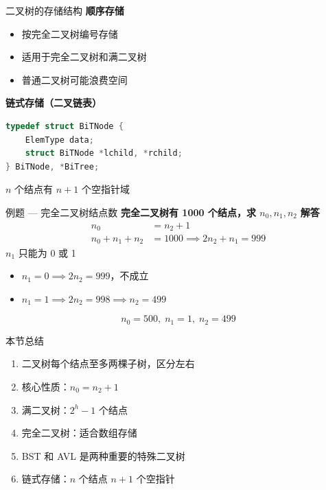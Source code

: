 \documentclass[10pt, aspectratio=169]{beamer}
\begin{document}
\begin{frame}[fragile]{二叉树的存储结构}
    \textbf{顺序存储}
    \begin{itemize}
        \item 按完全二叉树编号存储
        \item 适用于完全二叉树和满二叉树
        \item 普通二叉树可能浪费空间
    \end{itemize}
    \vspace{0.3em}
    \textbf{链式存储（二叉链表）}
    \begin{lstlisting}[language=C, basicstyle=\ttfamily\small]
typedef struct BiTNode {
    ElemType data;
    struct BiTNode *lchild, *rchild;
} BiTNode, *BiTree;
    \end{lstlisting}
    \vspace{0.3em}
    $n$ 个结点有 $n+1$ 个空指针域
\end{frame}

\begin{frame}{例题 --- 完全二叉树结点数}
    \textbf{完全二叉树有 1000 个结点，求 $n_0, n_1, n_2$}
    \vspace{0.5em}
    \textbf{解答}
    \[
    \begin{aligned}
    n_0 &= n_2 + 1\\
    n_0 + n_1 + n_2 &= 1000 \implies 2n_2 + n_1 = 999
    \end{aligned}
    \]
    $n_1$ 只能为 0 或 1
    \begin{itemize}
        \item $n_1 = 0 \implies 2n_2 = 999$，不成立
        \item $n_1 = 1 \implies 2n_2 = 998 \implies n_2 = 499$
    \end{itemize}
    \[
    n_0 = 500,\; n_1 = 1,\; n_2 = 499
    \]
\end{frame}

\begin{frame}{本节总结}
    \begin{enumerate}
        \item 二叉树每个结点至多两棵子树，区分左右
        \item 核心性质：$n_0 = n_2 + 1$
        \item 满二叉树：$2^h - 1$ 个结点
        \item 完全二叉树：适合数组存储
        \item BST 和 AVL 是两种重要的特殊二叉树
        \item 链式存储：$n$ 个结点 $n+1$ 个空指针
    \end{enumerate}
\end{frame}
\end{document}
